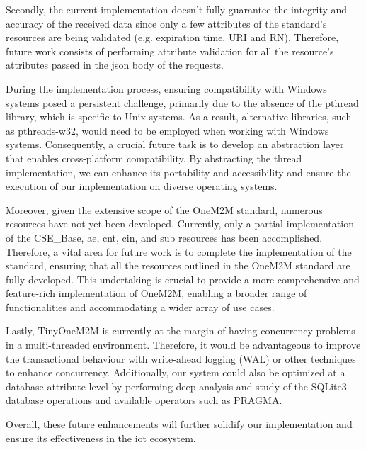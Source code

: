 \documentclass[a4paper,fleqn]{cas-dc}
\begin{document}
Secondly, the current implementation doesn't fully guarantee the integrity and accuracy of the received data since only a few attributes of the standard's resources are being validated (e.g. expiration time, URI and RN). Therefore, future work consists of performing attribute validation for all the resource's attributes passed in the \gls{json} body of the requests.

During the implementation process, ensuring compatibility with Windows systems posed a persistent challenge, primarily due to the absence of the pthread library, which is specific to Unix systems. As a result, alternative libraries, such as pthreads-w32, would need to be employed when working with Windows systems. Consequently, a crucial future task is to develop an abstraction layer that enables cross-platform compatibility. By abstracting the thread implementation, we can enhance its portability and accessibility and ensure the execution of our implementation on diverse operating systems.

Moreover, given the extensive scope of the OneM2M standard, numerous resources have not yet been developed. Currently, only a partial implementation of the CSE\_Base, \gls{ae}, \gls{cnt}, \gls{cin}, and \gls{sub} resources has been accomplished. Therefore, a vital area for future work is to complete the implementation of the standard, ensuring that all the resources outlined in the OneM2M standard are fully developed. This undertaking is crucial to provide a more comprehensive and feature-rich implementation of OneM2M, enabling a broader range of functionalities and accommodating a wider array of use cases.

Lastly, TinyOneM2M is currently at the margin of having concurrency problems in a multi-threaded environment. Therefore, it would be advantageous to improve the transactional behaviour with write-ahead logging (WAL) or other techniques to enhance concurrency. Additionally, our system could also be optimized at a database attribute level by performing deep analysis and study of the SQLite3 database operations and available operators such as PRAGMA.

Overall, these future enhancements will further solidify our implementation and ensure its effectiveness in the \gls{iot} ecosystem.


%
%



\end{document}
